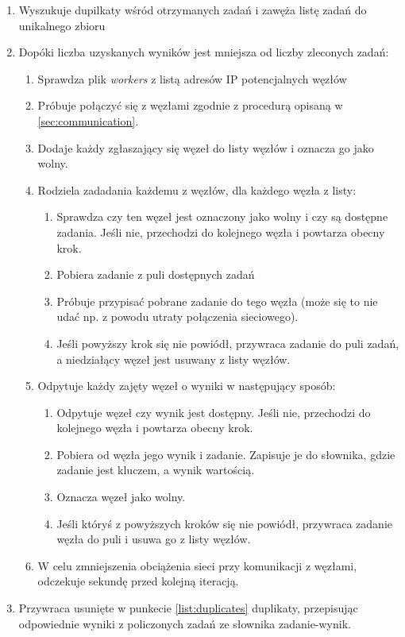 \begin{enumerate}
  \item Wyszukuje dupilkaty wśród otrzymanych zadań i zawęża listę zadań do unikalnego zbioru\label{list:duplicates}
  \item Dopóki liczba uzyskanych wyników jest mniejsza od liczby zleconych zadań:
    \begin{enumerate}
      \item Sprawdza plik \textit{workers} z listą adresów IP potencjalnych węzłów
      \item Próbuje połączyć się z węzłami zgodnie z procedurą opisaną w \ref{sec:communication}.
      \item Dodaje każdy zgłaszający się węzeł do listy węzłów i oznacza go jako wolny.
      \item Rodziela zadadania każdemu z węzłów, dla każdego węzła z listy:
        \begin{enumerate}
          \item Sprawdza czy ten węzeł jest oznaczony jako wolny i czy są dostępne zadania.
                Jeśli nie, przechodzi do kolejnego węzła i powtarza obecny krok.
          \item Pobiera zadanie z puli dostępnych zadań
          \item Próbuje przypisać pobrane zadanie do tego węzła (może się to nie udać np. z powodu utraty połączenia sieciowego).
          \item Jeśli powyższy krok się nie powiódł, przywraca zadanie do puli zadań, a niedziałący węzeł jest usuwany z listy węzłów.
        \end{enumerate}
      \item Odpytuje każdy zajęty węzeł o wyniki w następujący sposób:\label{enum:second_worker_check}
      \begin{enumerate}
        \item Odpytuje węzeł czy wynik jest dostępny.
              Jeśli nie, przechodzi do kolejnego węzła i powtarza obecny krok.
        \item Pobiera od węzła jego wynik i zadanie. Zapisuje je do słownika, gdzie zadanie jest kluczem, a wynik wartością.
        \item Oznacza węzeł jako wolny.
        \item Jeśli któryś z powyższych kroków się nie powiódł, przywraca zadanie węzła do puli i usuwa go z listy węzłów.
      \end{enumerate}
      \item W celu zmniejszenia obciążenia sieci przy komunikacji z węzłami, odczekuje sekundę przed kolejną iteracją.
    \end{enumerate}
  \item Przywraca usunięte w punkecie \ref{list:duplicates} duplikaty, przepisując odpowiednie wyniki z policzonych zadań ze słownika zadanie-wynik.
\end{enumerate}

